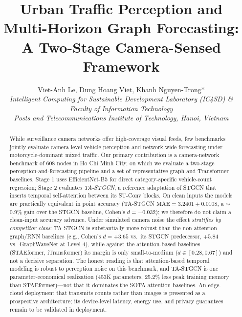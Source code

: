 \documentclass[journal,twocolumn]{IEEEtran}
\begin{document}
\pagestyle{plain}
\thispagestyle{plain}

\title{\Large \bfseries Urban Traffic Perception and Multi-Horizon Graph Forecasting: A Two-Stage Camera-Sensed Framework}

\author{Viet-Anh Le, Dung Hoang Viet, Khanh Nguyen-Trong*\\
\textit{Intelligent Computing for Sustainable Development Laboratory (IC4SD) \& Faculty of Information Technology \\ Posts and Telecommunications Institute of Technology, Hanoi, Vietnam}\\
}


\maketitle
\thispagestyle{plain}

\begin{abstract}
While surveillance camera networks offer high-coverage visual feeds, few benchmarks jointly evaluate camera-level vehicle perception and network-wide forecasting under motorcycle-dominant mixed traffic. Our primary contribution is a camera-network benchmark of 608 nodes in Ho Chi Minh City, on which we evaluate a two-stage perception-and-forecasting pipeline and a set of representative graph and Transformer baselines. Stage 1 uses EfficientNet-B5 for direct category-specific vehicle-count regression; Stage 2 evaluates \emph{TA-STGCN}, a reference adaptation of STGCN that inserts temporal self-attention between its ST-Conv blocks. On clean inputs the models are practically equivalent in point accuracy (TA-STGCN $\text{MAE} = 3.2401 \pm 0.0108$, a $\sim$0.9\% gain over the STGCN baseline, Cohen's $d = -0.032$); we therefore do not claim a clean-input accuracy advance. Under simulated camera noise the effect \emph{stratifies by competitor class}: TA-STGCN is substantially more robust than the non-attention graph/RNN baselines (e.g., Cohen's $d = +3.65$ vs.\ its STGCN predecessor, $+5.84$ vs.\ GraphWaveNet at Level 4), while against the attention-based baselines (STAEformer, iTransformer) its margin is only small-to-medium ($d \in [0.28, 0.67]$) and not a decisive separation. The honest reading is that attention-based temporal modeling is robust to perception noise on this benchmark, and TA-STGCN is one parameter-economical realization (453K parameters, $25.2\%$ less peak training memory than STAEformer)---not that it dominates the SOTA attention baselines. An edge-cloud deployment that transmits counts rather than images is presented as a prospective architecture; its device-level latency, energy use, and privacy guarantees remain to be validated in deployment.
\end{abstract}
\end{document}
